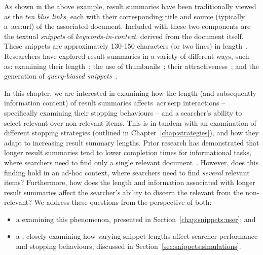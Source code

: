 As shown in the above example, result summaries have been traditionally viewed as the \emph{ten blue links}, each with their corresponding title and source (typically a~\gls{acr:url}) of the associated document. Included with these two components are the textual \emph{snippets} of \emph{keywords-in-context}, derived from the document itself. These snippets are approximately 130-150 characters (or two lines) in length~\citep{hearst2009_search}. Researchers have explored result summaries in a variety of different ways, such as: examining their length~\citep{paek2004wavelens,cutrell2007eye_tracking,kaisser2008improving}; the use of thumbnails~\citep{woodruff2002summaries,teevan2009visual_snippets}; their attractiveness~\citep{clarke2007caption_features,he2012bridging}; and the generation of \emph{query-biased snippets}~\citep{tombros1998query_biased,rose2007snippet_attributes}.



In this chapter, we are interested in examining how the length (and subsequently information content) of result summaries affects~\gls{acr:serp} interactions -- specifically examining their stopping behaviours -- and a searcher's ability to select relevant over non-relevant items. This is in tandem with an examination of different stopping strategies (outlined in Chapter~\ref{chap:strategies}), and how they adapt to increasing result summary lengths. Prior research has demonstrated that longer result summaries tend to lower completion times for informational tasks, where searchers need to find only a single relevant document~\citep{cutrell2007eye_tracking}. However, does this finding hold in an ad-hoc context, where searchers need to find \emph{several} relevant items? Furthermore, how does the length and information associated with longer result summaries affect the searcher's ability to discern the relevant from the non-relevant? We address these questions from the perspective of both:

\begin{itemize}
    \item{a  examining this phenomenon, presented in Section~\ref{chap:snippets:user}; and}
    \item{a , closely examining how varying snippet lengths affect searcher performance and stopping behaviours, discussed in Section~\ref{sec:snippets:simulations}.}
\end{itemize}

